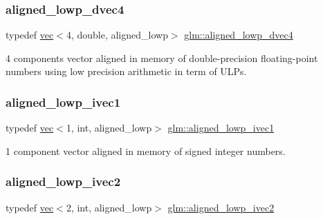\subsubsection{\texorpdfstring{aligned\+\_\+lowp\+\_\+dvec4}{aligned\_lowp\_dvec4}}
{\footnotesize\ttfamily typedef \mbox{\hyperlink{structglm_1_1vec}{vec}}$<$4, double, aligned\+\_\+lowp$>$ \mbox{\hyperlink{group__gtc__type__aligned_ga0c40d2f75a8bdae67116c4c973252baf}{glm\+::aligned\+\_\+lowp\+\_\+dvec4}}}



4 components vector aligned in memory of double-\/precision floating-\/point numbers using low precision arithmetic in term of U\+L\+Ps. 

\mbox{\label{group__gtc__type__aligned_gadf9e665b78c3aead513e9505fa31f9e2}} 
\subsubsection{\texorpdfstring{aligned\+\_\+lowp\+\_\+ivec1}{aligned\_lowp\_ivec1}}
{\footnotesize\ttfamily typedef \mbox{\hyperlink{structglm_1_1vec}{vec}}$<$1, int, aligned\+\_\+lowp$>$ \mbox{\hyperlink{group__gtc__type__aligned_gadf9e665b78c3aead513e9505fa31f9e2}{glm\+::aligned\+\_\+lowp\+\_\+ivec1}}}



1 component vector aligned in memory of signed integer numbers. 

\mbox{\label{group__gtc__type__aligned_ga186cb1ada403d7a52411f64c83295486}} 
\subsubsection{\texorpdfstring{aligned\+\_\+lowp\+\_\+ivec2}{aligned\_lowp\_ivec2}}
{\footnotesize\ttfamily typedef \mbox{\hyperlink{structglm_1_1vec}{vec}}$<$2, int, aligned\+\_\+lowp$>$ \mbox{\hyperlink{group__gtc__type__aligned_ga186cb1ada403d7a52411f64c83295486}{glm\+::aligned\+\_\+lowp\+\_\+ivec2}}}



